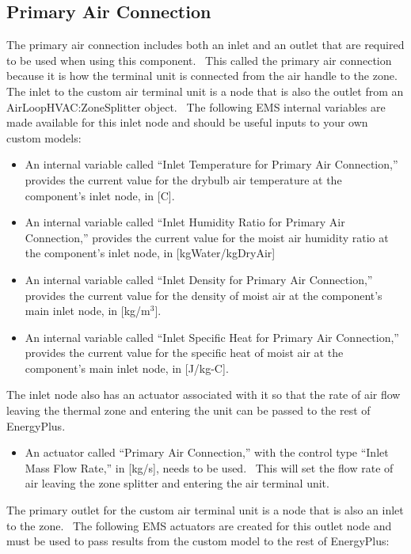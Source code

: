 \subsection{Primary Air Connection}\label{primary-air-connection}

The primary air connection includes both an inlet and an outlet that are required to be used when using this component.~ This called the primary air connection because it is how the terminal unit is connected from the air handle to the zone.~ The inlet to the custom air terminal unit is a node that is also the outlet from an AirLoopHVAC:ZoneSplitter object.~ The following EMS internal variables are made available for this inlet node and should be useful inputs to your own custom models:

\begin{itemize}
\item
  An internal variable called ``Inlet Temperature for Primary Air Connection,'' provides the current value for the drybulb air temperature at the component's inlet node, in {[}C{]}.
\item
  An internal variable called ``Inlet Humidity Ratio for Primary Air Connection,'' provides the current value for the moist air humidity ratio at the component's inlet node, in {[}kgWater/kgDryAir{]}
\item
  An internal variable called ``Inlet Density for Primary Air Connection,'' provides the current value for the density of moist air at the component's main inlet node, in {[}kg/m\(^{3}\){]}.
\item
  An internal variable called ``Inlet Specific Heat for Primary Air Connection,'' provides the current value for the specific heat of moist air at the component's main inlet node, in {[}J/kg-C{]}.
\end{itemize}

The inlet node also has an actuator associated with it so that the rate of air flow leaving the thermal zone and entering the unit can be passed to the rest of EnergyPlus.

\begin{itemize}
\tightlist
\item
  An actuator called ``Primary Air Connection,'' with the control type ``Inlet Mass Flow Rate,'' in {[}kg/s{]}, needs to be used.~ This will set the flow rate of air leaving the zone splitter and entering the air terminal unit.
\end{itemize}

The primary outlet for the custom air terminal unit is a node that is also an inlet to the zone.~ The following EMS actuators are created for this outlet node and must be used to pass results from the custom model to the rest of EnergyPlus:

